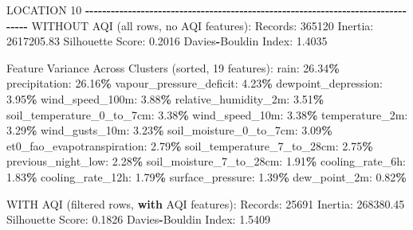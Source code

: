 \documentclass[
  letterpaper,
  DIV=11,
  numbers=noendperiod]{scrartcl}
\newenvironment{Shaded}{\begin{snugshade}}{\end{snugshade}}
\newcommand{\BuiltInTok}[1]{#1}
\newcommand{\ControlFlowTok}[1]{\textcolor[rgb]{0.13,0.29,0.53}{\textbf{#1}}}
\newcommand{\DecValTok}[1]{\textcolor[rgb]{0.00,0.00,0.81}{#1}}
\newcommand{\FloatTok}[1]{\textcolor[rgb]{0.00,0.00,0.81}{#1}}
\newcommand{\NormalTok}[1]{#1}
\newcommand{\OperatorTok}[1]{\textcolor[rgb]{0.81,0.36,0.00}{\textbf{#1}}}
\begin{document}
\begin{Shaded}
\begin{Highlighting}[]
\NormalTok{LOCATION }\DecValTok{10}
\OperatorTok{{-}{-}{-}{-}{-}{-}{-}{-}{-}{-}{-}{-}{-}{-}{-}{-}{-}{-}{-}{-}{-}{-}{-}{-}{-}{-}{-}{-}{-}{-}{-}{-}{-}{-}{-}{-}{-}{-}{-}{-}{-}{-}{-}{-}{-}{-}{-}{-}{-}{-}{-}{-}{-}{-}{-}{-}{-}{-}{-}{-}{-}{-}{-}{-}{-}{-}{-}{-}{-}{-}{-}{-}{-}{-}{-}{-}{-}{-}{-}{-}}
\NormalTok{WITHOUT AQI (}\BuiltInTok{all}\NormalTok{ rows, no AQI features):}
\NormalTok{  Records: }\DecValTok{365120}
\NormalTok{  Inertia: }\FloatTok{2617205.83}
\NormalTok{  Silhouette Score: }\FloatTok{0.2016}
\NormalTok{  Davies}\OperatorTok{{-}}\NormalTok{Bouldin Index: }\FloatTok{1.4035}

\NormalTok{  Feature Variance Across Clusters (}\BuiltInTok{sorted}\NormalTok{, }\DecValTok{19}\NormalTok{ features):}
\NormalTok{    rain: }\FloatTok{26.34}\OperatorTok{\%}
\NormalTok{    precipitation: }\FloatTok{26.16}\OperatorTok{\%}
\NormalTok{    vapour\_pressure\_deficit: }\FloatTok{4.23}\OperatorTok{\%}
\NormalTok{    dewpoint\_depression: }\FloatTok{3.95}\OperatorTok{\%}
\NormalTok{    wind\_speed\_100m: }\FloatTok{3.88}\OperatorTok{\%}
\NormalTok{    relative\_humidity\_2m: }\FloatTok{3.51}\OperatorTok{\%}
\NormalTok{    soil\_temperature\_0\_to\_7cm: }\FloatTok{3.38}\OperatorTok{\%}
\NormalTok{    wind\_speed\_10m: }\FloatTok{3.38}\OperatorTok{\%}
\NormalTok{    temperature\_2m: }\FloatTok{3.29}\OperatorTok{\%}
\NormalTok{    wind\_gusts\_10m: }\FloatTok{3.23}\OperatorTok{\%}
\NormalTok{    soil\_moisture\_0\_to\_7cm: }\FloatTok{3.09}\OperatorTok{\%}
\NormalTok{    et0\_fao\_evapotranspiration: }\FloatTok{2.79}\OperatorTok{\%}
\NormalTok{    soil\_temperature\_7\_to\_28cm: }\FloatTok{2.75}\OperatorTok{\%}
\NormalTok{    previous\_night\_low: }\FloatTok{2.28}\OperatorTok{\%}
\NormalTok{    soil\_moisture\_7\_to\_28cm: }\FloatTok{1.91}\OperatorTok{\%}
\NormalTok{    cooling\_rate\_6h: }\FloatTok{1.83}\OperatorTok{\%}
\NormalTok{    cooling\_rate\_12h: }\FloatTok{1.79}\OperatorTok{\%}
\NormalTok{    surface\_pressure: }\FloatTok{1.39}\OperatorTok{\%}
\NormalTok{    dew\_point\_2m: }\FloatTok{0.82}\OperatorTok{\%}

\NormalTok{WITH AQI (filtered rows, }\ControlFlowTok{with}\NormalTok{ AQI features):}
\NormalTok{  Records: }\DecValTok{25691}
\NormalTok{  Inertia: }\FloatTok{268380.45}
\NormalTok{  Silhouette Score: }\FloatTok{0.1826}
\NormalTok{  Davies}\OperatorTok{{-}}\NormalTok{Bouldin Index: }\FloatTok{1.5409}


\end{Highlighting}
\end{Shaded}
\end{document}
